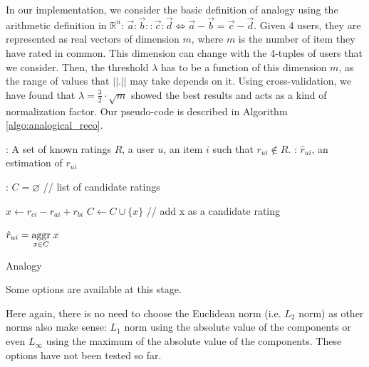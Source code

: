 In our implementation, we consider the basic definition of analogy using the
arithmetic definition in $\mathbb{R}^n$: $\vec{a}:\vec{b}::\vec{c}:\vec{d}
\iff \vec{a}-\vec{b}=\vec{c}-\vec{d}$.
Given 4 users, they are represented as real vectors of dimension $m$, where $m$
is the number of item they have rated in common. This dimension can
change with the 4-tuples of users that we consider. 
Then, the threshold $\lambda$ has to be a function of this dimension $m$,
as the range of values that $||.||$ may take depends on it. Using
cross-validation, we have found that $\lambda = \frac{3}{2} \cdot\sqrt{m}$ showed the
best results and acts as a kind of normalization factor.
Our pseudo-code is described in
Algorithm \ref{algo:analogical_reco}.
 \begin{algorithm}[!ht]
       \begin{algorithmic}

      : A set of known ratings $R$, a user $u$, an item
      $i$ such that $r_{ui} \notin R$.
      : $\hat{r}_{ui}$, an estimation of $r_{ui}$

      :
      \STATE $C = \varnothing$ \quad \quad // list of candidate ratings
      
      \STATE  $x \leftarrow r_{ci} - r_{ai} + r_{bi}$
      \STATE $C \gets C \cup \{x\}$ \quad // add x as a candidate rating
	  \ENDFOR

    \STATE $\hat{r}_{ui} = \underset{x \in C}{\operatorname{aggr}}\; x$

\end{algorithmic}
     \caption{Analogy}
       \label{algo:analogical_reco}
\end{algorithm}

Some options are available at this stage. 

Here again, there is no need to choose the Euclidean norm (i.e. $L_2$ norm) as
other norms also make sense: $L_1$ norm using the absolute value of the
components or even $L_\infty$ using the maximum of the absolute value of the
components. These options have not been tested so far.

